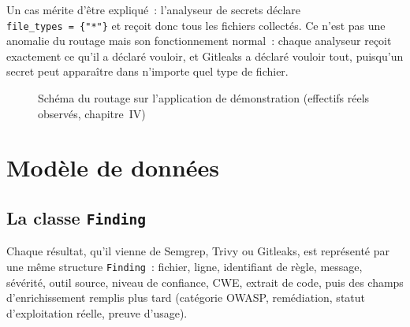 \documentclass[12pt,a4paper,oneside]{report}
\begin{document}
Un cas m\'erite d'\^etre expliqu\'e~: l'analyseur de secrets d\'eclare \texttt{file\_types~=~\{"*"\}} et re\c{c}oit donc tous les fichiers collect\'es. Ce n'est pas une anomalie du routage mais son fonctionnement normal~: chaque analyseur re\c{c}oit exactement ce qu'il a d\'eclar\'e vouloir, et Gitleaks a d\'eclar\'e vouloir tout, puisqu'un secret peut appara\^itre dans n'importe quel type de fichier.

\begin{figure}[H]
\centering
{}
\caption{Sch\'ema du routage sur l'application de d\'emonstration (effectifs r\'eels observ\'es, chapitre~IV)}
\label{fig:routage}
\end{figure}

\section{Mod\`ele de donn\'ees}

\subsection{La classe \texttt{Finding}}
Chaque r\'esultat, qu'il vienne de Semgrep, Trivy ou Gitleaks, est repr\'esent\'e par une m\^eme structure \texttt{Finding}~: fichier, ligne, identifiant de r\`egle, message, s\'ev\'erit\'e, outil source, niveau de confiance, CWE, extrait de code, puis des champs d'enrichissement remplis plus tard (cat\'egorie OWASP, remédiation, statut d'exploitation r\'eelle, preuve d'usage).
\end{document}
